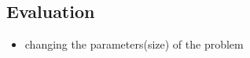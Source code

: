 \subsection{Evaluation }
\begin{itemize}
\item changing the parameters(size) of the problem
\end{itemize}